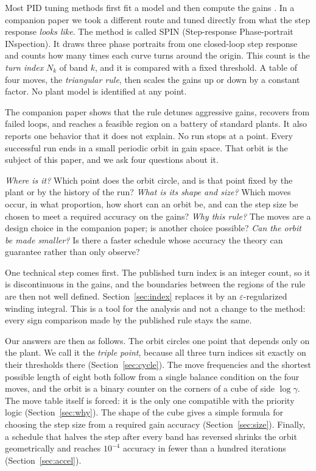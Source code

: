 \documentclass[letterpaper, 10pt, conference, twocolumn]{ieeeconf}
\begin{document}
Most PID tuning methods first fit a model and then compute the gains
\cite{ZN1942,AstromHagglund2004}. In a companion paper \cite{Paper1} we took a
different route and tuned directly from what the step response \emph{looks
like}. The method is called SPIN (Step-response Phase-portrait INspection). It
draws three phase portraits from one closed-loop step response and counts how
many times each curve turns around the origin. This count is the \emph{turn
index} $N_k$ of band $k$, and it is compared with a fixed threshold. A table of
four moves, the \emph{triangular rule}, then scales the gains up or down by a
constant factor. No plant model is identified at any point.

The companion paper shows that the rule detunes aggressive gains, recovers
from failed loops, and reaches a feasible region on a battery of standard
plants. It also reports one behavior that it does not explain. No run stops at
a point. Every successful run ends in a small periodic orbit in gain space.
That orbit is the subject of this paper, and we ask four questions about it.

\emph{Where is it?} Which point does the orbit circle, and is that point
fixed by the plant or by the history of the run? \emph{What is its shape and
size?} Which moves occur, in what proportion, how short can an orbit be, and
can the step size be chosen to meet a required accuracy on the gains?
\emph{Why this rule?} The moves are a design choice in the companion paper;
is another choice possible? \emph{Can the orbit be made smaller?} Is there a
faster schedule whose accuracy the theory can guarantee rather than only
observe?

One technical step comes first. The published turn index is an integer count,
so it is discontinuous in the gains, and the boundaries between the regions of
the rule are then not well defined. Section~\ref{sec:index} replaces it by an
$\varepsilon$-regularized winding integral. This is a tool for the analysis and
not a change to the method: every sign comparison made by the published rule
stays the same.

Our answers are then as follows. The orbit circles one point that depends only
on the plant. We call it the \emph{triple point}, because all three turn
indices sit exactly on their thresholds there (Section~\ref{sec:cycle}). The
move frequencies and the shortest possible length of eight both follow from a
single balance condition on the four moves, and the orbit is a binary counter
on the corners of a cube of side $\log\gamma$. The move table itself is forced:
it is the only one compatible with the priority logic
(Section~\ref{sec:why}). The shape of the cube gives a simple formula for
choosing the step size from a required gain accuracy (Section~\ref{sec:size}).
Finally, a schedule that halves the step after every band has reversed shrinks
the orbit geometrically and reaches $10^{-4}$ accuracy in fewer than a hundred
iterations (Section~\ref{sec:accel}).
\end{document}
